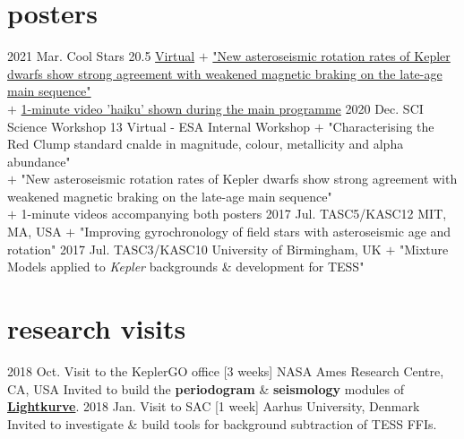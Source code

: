 \documentclass[letterpaper]{k-cv} %
\begin{document}
\section{\color{c1}posters}

\begin{entrylist}
	\centry
	{2021 Mar.}
	{Cool Stars 20.5}
	{\href{http://coolstars20.cfa.harvard.edu/cs20half/program.html}{Virtual}}
	{$+$ \small{\href{https://zenodo.org/record/4562478}{"New asteroseismic rotation rates of Kepler dwarfs show strong agreement with weakened magnetic braking on the late-age main sequence"}}\\
		$+$ \small{\href{https://zenodo.org/record/4562487}{1-minute video 'haiku' shown during the main programme}}}
	\centry
	{2020 Dec.}
	{SCI Science Workshop 13}
	{Virtual - ESA Internal Workshop}
	{$+$ \small{"Characterising the Red Clump standard cnalde in magnitude, colour, metallicity and alpha abundance"}\\
		$+$ \small{"New asteroseismic rotation rates of Kepler dwarfs show strong agreement with weakened magnetic braking on the late-age main sequence"}\\
		$+$ \small{1-minute videos accompanying both posters}}
	\centry
	{2017 Jul.}
	{TASC5/KASC12}
	{MIT, MA, USA}
	{$+$ \small{"Improving gyrochronology of field stars with asteroseismic age and rotation"}}
	\centry
	{2017 Jul.}
	{TASC3/KASC10}
	{University of Birmingham, UK}
	{$+$ \small{"Mixture Models applied to \emph{Kepler} backgrounds \& development for TESS"}}
	
\end{entrylist}

\section{\color{c1}research visits}
\begin{entrylist}
	\entry
	{2018 Oct.}
	{Visit to the KeplerGO office [3 weeks]}
	{NASA Ames Research Centre, CA, USA}
	{Invited to build the \textbf{\textcolor{c1}{periodogram}} \&  \textbf{\textcolor{c1}{seismology}} modules of \textbf{\textcolor{c1}{\href{http://docs.lightkurve.org/}{Lightkurve}}}.}
	\entry
	{2018 Jan.}
	{Visit to SAC [1 week]}
	{Aarhus University, Denmark}
	{Invited to investigate \& build tools for background subtraction of TESS FFIs.}
\end{entrylist}
\end{document}
